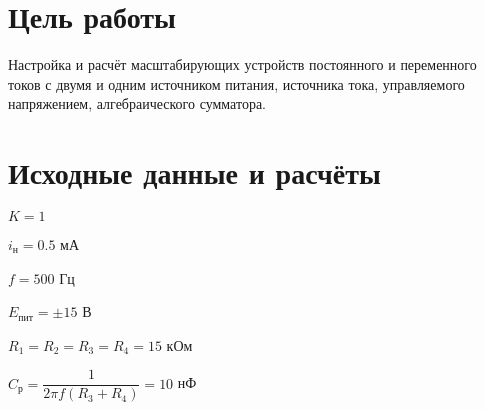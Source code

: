 \section{Цель работы}
Настройка и расчёт масштабирующих устройств постоянного и переменного токов с двумя и одним источником питания, источника тока, управляемого напряжением, алгебраического сумматора.
\section{Исходные данные и расчёты}
\begin{multicols}{2}
{\setlength{\parindent}{0cm}
$K = 1$

$i_{н} = 0.5$ мА

$f = 500$ Гц

$E_{пит} = \pm15$ В

$R_1 = R_2 = R_3 = R_4 = 15$ кОм

\vspace{1mm}
$C_р = \dfrac{1}{2\pi f(R_3+R_4)} = 10$ нФ
}
\end{multicols}